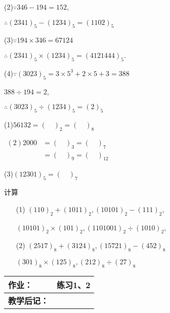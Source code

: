 (2)$\because 346-194=152$,

$\therefore(2341)_{5}-(1234)_{5}=(1102)_{5}$

(3)$\because 194 \times 346=67124$

$\therefore (2341)_{5} \times(1234)_{5}=(4121444)_{5} .$

(4)$\because (3023)_{5}=3 \times 5^{3}+2 \times 5+3=388$

$388 \div 194=2$,

$\therefore (3023)_{5} \div(1234)_{5}=(2)_{5}$

 (1)$56132=(\quad)_{2}=(\quad)_{8}$

$\begin{aligned} (2)2000 &=(\quad)_{3}=(\quad)_{7} \\ &=(\quad)_{9}=(\quad)_{12} \end{aligned}$

(3)$(12301)_{5}=(\quad)_{7}$

 计算 
\begin{enumerate}[itemindent=2em]
	\item[(1)] $(110)_{2}+(1011)_{2},(10101)_{2}-(111)_{2}$,
	
	$(10101)_{2} \times(101)_{2},(1101001)_{2} \div(1010)_{2}$,
	\item[(2)] $(2517)_{8}+(3124)_{8},(15721)_{8}-(452)_{8}$
	
	$(301)_{8} \times(125)_{8},(212)_{8} \div(27)_{8}$
\end{enumerate}

\begin{table}[htb]
	\centering  
	\begin{tabular}{p{22mm}|p{105.6mm}}
		\hline 
		\textbf{作业：}      & 练习1、2  \\ \hline
		\textbf{教学后记：}  & \vspace{6ex} \\ \hline
	\end{tabular}
\end{table}


